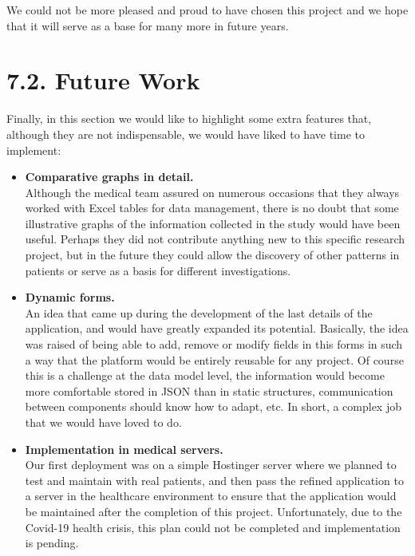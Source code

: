     We could not be more pleased and proud to have chosen this project and we hope that it will serve as a base for many more in future years. \newpage
    
 \section*{7.2. Future Work}
      
Finally, in this section we would like to highlight some extra features that, although they are not indispensable, we would have liked to have time to implement:
 \newline
 
 \begin{itemize}
  \item\textbf{Comparative graphs in detail.} \\
Although the medical team assured on numerous occasions that they always worked with Excel tables for data management, there is no doubt that some illustrative graphs of the information collected in the study would have been useful. Perhaps they did not contribute anything new to this specific research project, but in the future they could allow the discovery of other patterns in patients or serve as a basis for different investigations. \\
  
  \item\textbf{Dynamic forms.} \\
  An idea that came up during the development of the last details of the application, and would have greatly expanded its potential. Basically, the idea was raised of being able to add, remove or modify fields in this forms in such a way that the platform would be entirely reusable for any project. Of course this is a challenge at the data model level, the information would become more comfortable stored in JSON than in static structures, communication between components should know how to adapt, etc. In short, a complex job that we would have loved to do. \\
  
  \item\textbf{Implementation in medical servers.} \\
  Our first deployment was on a simple Hostinger server where we planned to test and maintain with real patients, and then pass the refined application to a server in the healthcare environment to ensure that the application would be maintained after the completion of this project. Unfortunately, due to the Covid-19 health crisis, this plan could not be completed and implementation is pending.
  

\end{itemize}

